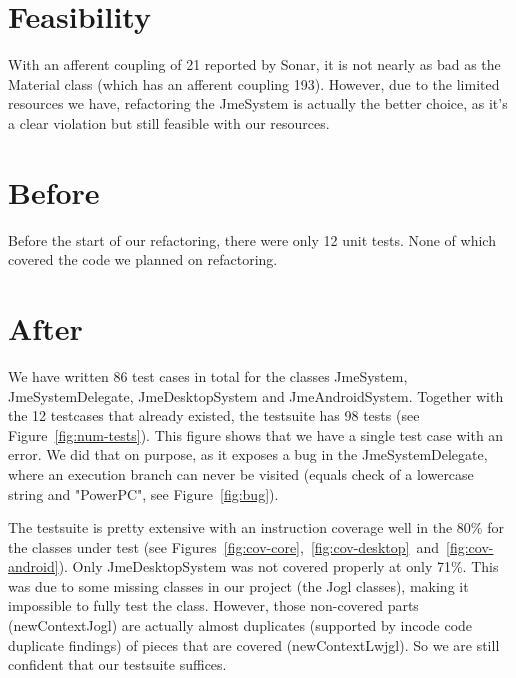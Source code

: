 \documentclass[a4paper, 10pt]{article}
\begin{document}
\section{Feasibility}
	With an afferent coupling of 21 reported by Sonar, 
	it is not nearly as bad as the Material class (which has an afferent coupling 193).
	However, due to the limited resources we have, refactoring the JmeSystem is actually the
	better choice, as it's a clear violation but still feasible with our resources.

\section{Before}
Before the start of our refactoring, there were only 12 unit tests.
None of which covered the code we planned on refactoring.


\section{After}
We have written 86 test cases in total for the classes JmeSystem, JmeSystemDelegate, JmeDesktopSystem and JmeAndroidSystem.
Together with the 12 testcases that already existed, the testsuite has 98 tests (see Figure~\ref{fig:num-tests}).
This figure shows that we have a single test case with an error.
We did that on purpose, as it exposes a bug in the JmeSystemDelegate, 
where an execution branch can never be visited (equals check of a lowercase string and "PowerPC", see Figure~\ref{fig:bug}).

The testsuite is pretty extensive with an instruction coverage well in the 80\% for the classes under test (see Figures~\ref{fig:cov-core},~\ref{fig:cov-desktop}~and~\ref{fig:cov-android}).
Only JmeDesktopSystem was not covered properly at only 71\%. 
This was due to some missing classes in our project (the Jogl classes),
making it impossible to fully test the class. 
However, those non-covered parts (newContextJogl) are actually almost duplicates (supported by incode code duplicate findings) of pieces that are covered (newContextLwjgl).
So we are still confident that our testsuite suffices.
\end{document}
